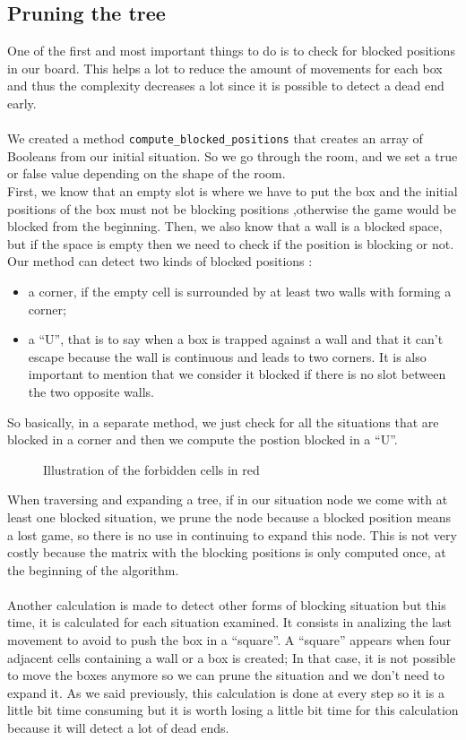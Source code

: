 \documentclass[journal]{IEEEtran}
\newcommand{\imageWithoutFigure}[2] { %
\fbox {\imageWithoutFigureAndBox{#1}{#2} }
}
\newcommand{\imageWithoutFigureAndBox}[2] { %
\texttt{[image: ./images/\#1.png]}
}
\newcommand{\Figure}[3] { %
\begin{figure}[!ht]
\centering{#1}
\caption{#2
\label{#3}
}
\end{figure}
}
\newcommand{\image}[4] { %
\Figure{\imageWithoutFigure{#1}{#2}} {#3} {#4}
}
\begin{document}
\subsection{Pruning the tree}
One of the first and most important things to do is to check for blocked positions in our board. This helps a lot to reduce the amount of movements for each box and thus the complexity decreases a lot since it is possible to detect a dead end early.
\\\\We created a method \verb|compute_blocked_positions| that creates an array of Booleans from our initial situation. So we go through the room, and we set a true or false value depending on the shape of the room.
\\
First, we know that an empty slot is where we have to put the box and the initial positions of the box must not be blocking positions ,otherwise the game would be blocked from the beginning. Then, we also know that a wall is a blocked space, but if the space is empty then we need to check if the position is blocking or not.\\
Our method can detect two kinds of blocked positions :
\begin{itemize}
\item a corner, if the empty cell is surrounded by at least two walls with forming a corner;
\item a ``U'', that is to say when a box is trapped against a wall and that it can't escape because the wall is continuous and leads to two corners. It is also  important to mention that we consider it blocked if there is no slot between the two opposite walls.
\end{itemize}
 So basically, in a separate method, we just check for all the situations that are blocked in a corner and then we compute the postion blocked in a ``U''.
\image
    {forbidden}
    {6}
    {Illustration of the forbidden cells in red}
    {fig:forbidden}
When traversing and expanding a tree, if in our situation node we come with at least one blocked situation, we prune the node because a blocked position means a lost game, so there is no use in continuing to expand this node. This is not very costly because the matrix with the blocking positions is only computed once, at the beginning of the algorithm.
\\\\
Another calculation is made to detect other forms of blocking situation but this time, it is calculated for each situation examined. It consists in analizing the last movement to avoid to push the box in a ``square''. A ``square'' appears when four adjacent cells containing a wall or a box is created; In that case, it is not possible to move the boxes anymore so we can prune the situation and we don't need to expand it. As we said previously, this calculation is done at every step so it is a little bit time consuming but it is worth losing a little bit time for this calculation because it will detect a lot of dead ends.
\end{document}
